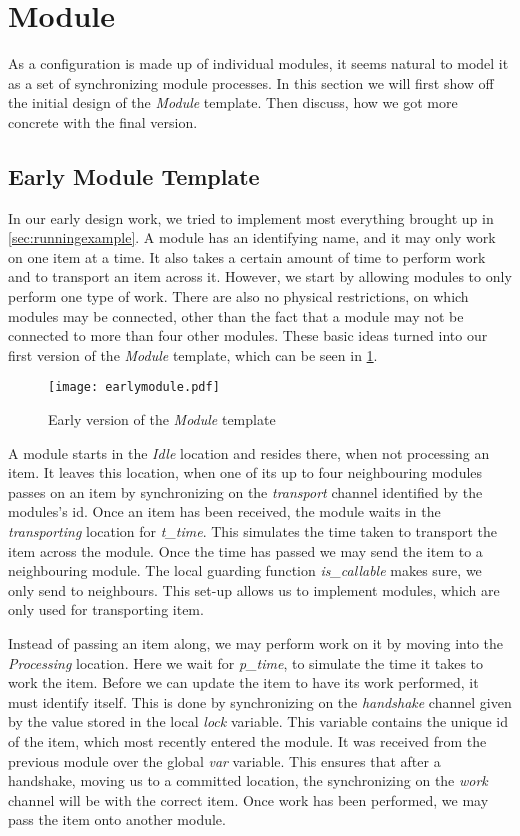 \section{Module}\label{subs:module}
As a configuration is made up of individual modules, it seems natural to model it as a set of synchronizing module processes. In this section we will first show off the initial design of the \textit{Module} template. Then discuss, how we got more concrete with the final version. 

\subsection{Early Module Template}
In our early design work, we tried to implement most everything brought up in \cref{sec:runningexample}. A module has an identifying name, and it may only work on one item at a time. It also takes a certain amount of time to perform  work and to transport an item across it. However, we start by allowing modules to only perform one type of work. There are also no physical restrictions, on which modules may be connected, other than the fact that a module may not be connected to more than four other modules. These basic ideas turned into our first version of the \textit{Module} template, which can be seen in \cref{fig:earlymodule}.


\begin{figure}[H]
\centering
\texttt{[image: earlymodule.pdf]}
\caption{Early version of the \textit{Module} template}
\label{fig:earlymodule}
\end{figure}

A module starts in the \emph{Idle} location and resides there, when not processing an item. It leaves this location, when one of its up to four neighbouring modules passes on an item by synchronizing on the \emph{transport} channel identified by the modules's id. Once an item has been received, the module waits in the \emph{transporting} location for \emph{t\_time}. This simulates the time taken to transport the item across the module. Once the time has passed we may send the item to a neighbouring module. The local guarding function \emph{is\_callable} makes sure, we only send to neighbours. This set-up allows us to implement modules, which are only used for transporting item.

Instead of passing an item along, we may perform work on it by moving into the \emph{Processing} location. Here we wait for \emph{p\_time}, to simulate the time it takes to work the item. Before we can update the item to have its work performed, it must identify itself. This is done by synchronizing on the \emph{handshake} channel given by the value stored in the local \emph{lock} variable. This variable contains the unique id of the item, which most recently entered the module. It was received from the previous module over the global \emph{var} variable. This ensures that after a handshake, moving us to a committed location, the synchronizing on the \emph{work} channel will be with the correct item. Once work has been performed, we may pass the item onto another module. 

